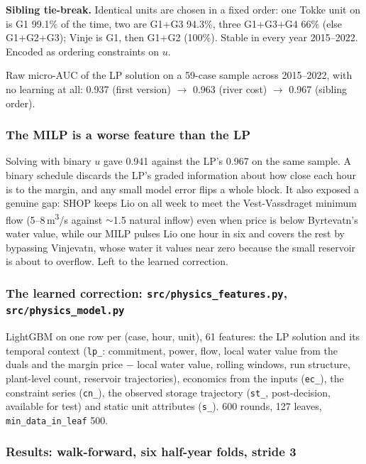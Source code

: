 \textbf{Sibling tie-break.} Identical units are chosen in a fixed order: one Tokke unit on is G1
99.1\% of the time, two are G1+G3 94.3\%, three G1+G3+G4 66\% (else G1+G2+G3); Vinje is G1, then
G1+G2 (100\%). Stable in every year 2015--2022. Encoded as ordering constraints on $u$.

Raw micro-AUC of the LP solution on a 59-case sample across 2015--2022, with no learning at all:
0.937 (first version) $\to$ 0.963 (river cost) $\to$ 0.967 (sibling order).

\subsubsection*{The MILP is a worse feature than the LP}

Solving with binary $u$ gave 0.941 against the LP's 0.967 on the same sample. A binary schedule
discards the LP's graded information about how close each hour is to the margin, and any small
model error flips a whole block. It also exposed a genuine gap: SHOP keeps Lio on all week to meet
the Vest-Vassdraget minimum flow (5--8\,m\textsuperscript{3}/s against $\sim$1.5 natural inflow) even
when price is below Byrtevatn's water value, while our MILP pulses Lio one hour in six and covers the
rest by bypassing Vinjevatn, whose water it values near zero because the small reservoir is about to
overflow. Left to the learned correction.

\subsubsection*{The learned correction: \texttt{src/physics\_features.py}, \texttt{src/physics\_model.py}}

LightGBM on one row per (case, hour, unit), 61 features: the LP solution and its temporal context
(\texttt{lp\_}: commitment, power, flow, local water value from the duals and the margin
price $-$ local water value, rolling windows, run structure, plant-level count, reservoir
trajectories), economics from the inputs (\texttt{ec\_}), the constraint series (\texttt{cn\_}),
the observed storage trajectory (\texttt{st\_}, post-decision, available for test) and static unit
attributes (\texttt{s\_}). 600 rounds, 127 leaves, \texttt{min\_data\_in\_leaf} 500.

\subsubsection*{Results: walk-forward, six half-year folds, stride 3}

